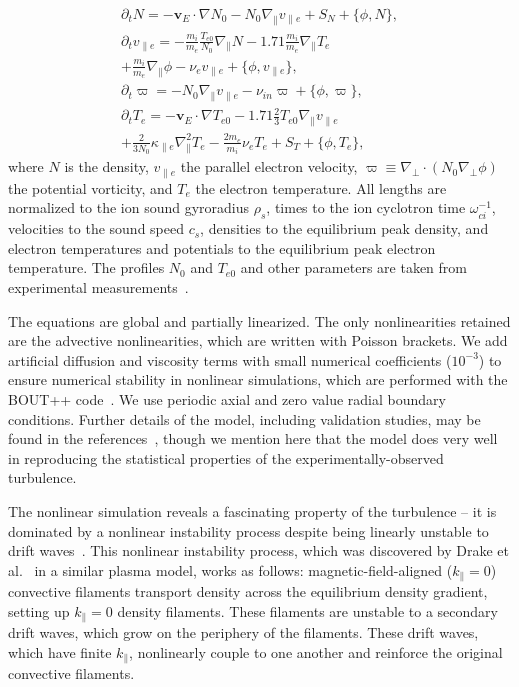 \documentclass[letter,scriptaddress,twocolumn, prl,showkeys]{revtex4}
\def\beqar{\begin{eqnarray}}
\def\eeqar{\end{eqnarray}}
\def\para{\parallel}
\newcommand{\pdt}{\partial_t}
\def\grad{\nabla}
\newcommand{\gradpar}{\grad_\parallel}
\newcommand{\gradperp}{\grad_\perp}
\newcommand{\vpe}{v_{\parallel e}}
\newcommand{\nue}{\nu_{e}}
\newcommand{\nuin}{\nu_{in}}
\newcommand{\kpe}{\kappa_{\parallel e}}
\newcommand{\fmie}{\frac{m_i}{m_e}}
\begin{document}
\beqar
\label{ni_eq}
\pdt N = - {\mathbf v_E} \cdot \grad N_0 - N_0 \gradpar \vpe + S_N + \{\phi,N\}, \\
\label{ve_eq}
\pdt \vpe = - \fmie \frac{T_{e0}}{N_0} \gradpar N - 1.71 \fmie \gradpar T_e  \nonumber \\
+ \fmie \gradpar \phi - \nue \vpe + \{\phi,\vpe \}, \\
\label{rho_eq}
\pdt \varpi = - N_0 \gradpar \vpe  - \nuin \varpi + \{\phi,\varpi \}, \\
\label{te_eq}
\pdt T_e = - {\mathbf v_E} \cdot \grad T_{e0} - 1.71 \frac{2}{3} T_{e0} \gradpar \vpe \nonumber \\
+ \frac{2}{3 N_0} \kpe \gradpar^2 T_e  - \frac{2 m_e}{m_i} \nue T_e  +  S_T + \{\phi,T_e\},
\eeqar
where $N$ is the density, $\vpe$ the parallel electron velocity, $\varpi \equiv \gradperp \cdot (N_0 \gradperp \phi)$ the potential vorticity,
and $T_e$ the electron temperature. All lengths are
normalized to the ion sound gyroradius $\rho_s$, times to the ion cyclotron time $\omega_{ci}^{-1}$, velocities to the sound speed $c_s$, densities to the equilibrium peak density, and electron
temperatures and potentials to the equilibrium peak electron temperature. The profiles $N_0$ and $T_{e0}$ and other parameters are taken from experimental 
measurements~\cite{schaffner2012,friedman2012b,friedman2013}. 

The equations are global and partially linearized. The only nonlinearities retained are the advective nonlinearities, which are written with Poisson brackets. 
We add artificial diffusion and viscosity terms with small numerical coefficients ($10^{-3}$)
to ensure numerical stability in nonlinear simulations, which are performed with the BOUT++ code~\cite{dudson2009}. We use periodic axial and zero value radial 
boundary conditions. Further details of the model, including validation studies, may be found in the references~\cite{Popovich2010a,Popovich2010b,Umansky2011,friedman2012b,friedman2013},
though we mention here that the model does very well in reproducing
the statistical properties of the experimentally-observed turbulence.

The nonlinear simulation reveals a fascinating property of the turbulence -- 
it is dominated by a nonlinear instability process despite being linearly unstable to drift waves~\cite{friedman2012b,friedman2013}.
This nonlinear instability process, which was discovered by Drake et al.~\cite{drake1995} in a similar plasma model, works as follows: 
magnetic-field-aligned ($k_\para=0$) convective filaments transport density across the equilibrium density gradient, setting up $k_\para=0$ density filaments. 
These filaments are unstable to a secondary drift waves, which grow on the periphery of the filaments. 
These drift waves, which have finite $k_\para$, nonlinearly couple to one another and reinforce the original convective filaments.
\end{document}
